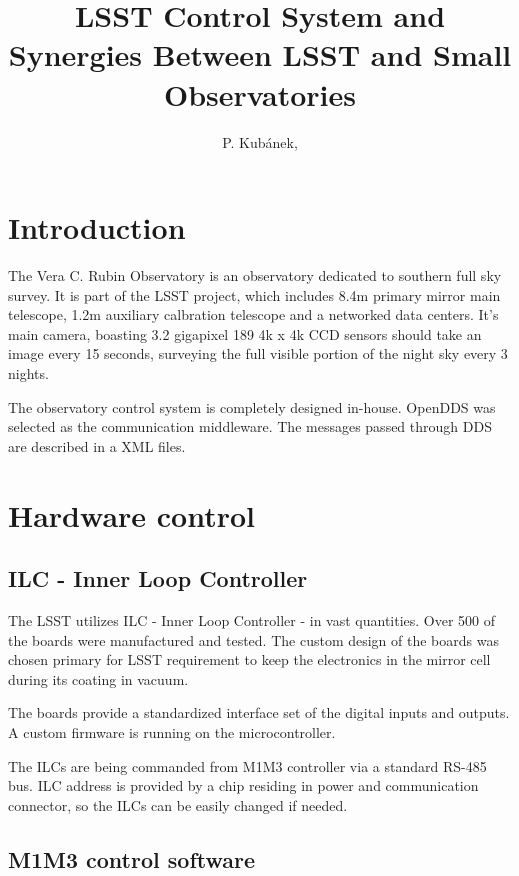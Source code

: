 \documentclass[proceedings, preprint]{rmaa}
\title{LSST Control System and Synergies Between LSST and Small Observatories}
\author{
  P. Kub\'anek,\altaffilmark{1} 
}
\begin{document}
\maketitle


\section{Introduction}
\label{sec:intro}

The Vera C. Rubin Observatory is an observatory dedicated to southern full sky
survey. It is part of the LSST\cite{2019lsst} project, which includes 8.4m
primary mirror main telescope, 1.2m auxiliary calbration telescope and a
networked data centers. It's main camera, boasting 3.2 gigapixel 189 4k x 4k
CCD sensors should take an image every 15 seconds, surveying the full visible
portion of the night sky every 3 nights.

The observatory control system is completely designed in-house.
OpenDDS\cite{opendds} was selected as the communication middleware. The
messages passed through DDS are described in a XML files\cite{salxml}.

\section{Hardware control}

\subsection{ILC - Inner Loop Controller}

The LSST utilizes ILC\cite{2014ilc} - Inner Loop Controller - in vast quantities. Over 500 of
the boards were manufactured and tested. The custom design of the boards was
chosen primary for LSST requirement to keep the electronics in the mirror cell
during its coating in vacuum.

The boards provide a standardized interface set of the digital inputs and
outputs. A custom firmware is running on the microcontroller.

The ILCs are being commanded from M1M3 controller via a standard RS-485 bus.
ILC address is provided by a chip residing in power and communication
connector, so the ILCs can be easily changed if needed.

\subsection{M1M3 control software}
\end{document}
